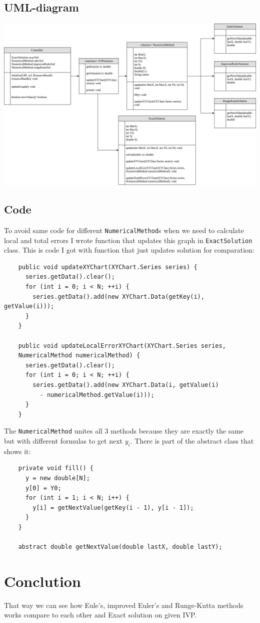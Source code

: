 \documentclass{article}
\begin{document}
  \subsection{UML-diagram}
  \includegraphics[scale=0.5]{UML.png}

  \subsection{Code}
  To avoid same code for different \texttt{NumericalMethod}s when we need to calculate local and total errors
  I wrote function that updates this graph in \texttt{ExactSolution} class. This is code I got with function
  that just updates solution for comparation:


  \begin{verbatim}
    public void updateXYChart(XYChart.Series series) {
      series.getData().clear();
      for (int i = 0; i < N; ++i) {
        series.getData().add(new XYChart.Data(getKey(i), getValue(i)));
      }
    }

    public void updateLocalErrorXYChart(XYChart.Series series,
    NumericalMethod numericalMethod) {
      series.getData().clear();
      for (int i = 0; i < N; ++i) {
        series.getData().add(new XYChart.Data(i, getValue(i)
          - numericalMethod.getValue(i)));
      }
    }

  \end{verbatim}

  The \texttt{NumericalMethod} unites all 3 methods because they are exactly the same
  but with different formulas to get next $y_i$. There is part of the abstract class that shows it:

  \begin{verbatim}
    private void fill() {
      y = new double[N];
      y[0] = Y0;
      for (int i = 1; i < N; i++) {
        y[i] = getNextValue(getKey(i - 1), y[i - 1]);
      }
    }

    abstract double getNextValue(double lastX, double lastY);
  \end{verbatim}

  \section{Conclution}

  That way we can see how Eule's, improved Euler's and Runge-Kutta methods works compare to each other
  and Exact solution on given IVP.
\end{document}
